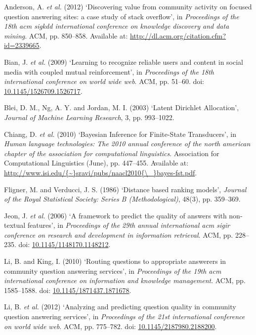 \documentclass[11pt,preprint, authoryear]{article}
\numberwithin{equation}{section}
\begin{document}
\hypertarget{ref-Anderson2012}{}
Anderson, A. \emph{et al.} (2012) `Discovering value from community
activity on focused question answering sites: a case study of stack
overflow', in \emph{Proceedings of the 18th acm sigkdd international
conference on knowledge discovery and data mining}. ACM, pp. 850--858.
Available at: \url{http://dl.acm.org/citation.cfm?id=2339665}.

\hypertarget{ref-Bian2009}{}
Bian, J. \emph{et al.} (2009) `Learning to recognize reliable users and
content in social media with coupled mutual reinforcement', in
\emph{Proceedings of the 18th international conference on world wide
web}. ACM, pp. 51--60. doi:
\href{https://doi.org/10.1145/1526709.1526717}{10.1145/1526709.1526717}.

\hypertarget{ref-Blei2003}{}
Blei, D. M., Ng, A. Y. and Jordan, M. I. (2003) `Latent Dirichlet
Allocation', \emph{Journal of Machine Learning Research}, 3, pp.
993--1022.

\hypertarget{ref-Chiang2010}{}
Chiang, D. \emph{et al.} (2010) `Bayesian Inference for Finite-State
Transducers', in \emph{Human language technologies: The 2010 annual
conference of the north american chapter of the association for
computational linguistics}. Association for Computational Linguistics
(June), pp. 447--455. Available at:
\href{http://www.isi.edu/\%7B~\%7Dsravi/pubs/naacl2010\%7B/_\%7Dbayes-fst.pdf}{http://www.isi.edu/\{\textasciitilde{}\}sravi/pubs/naacl2010\{\textbackslash{}\_\}bayes-fst.pdf}.

\hypertarget{ref-Fligner1986}{}
Fligner, M. and Verducci, J. S. (1986) `Distance based ranking models',
\emph{Journal of the Royal Statistical Society: Series B
(Methodological)}, 48(3), pp. 359--369.

\hypertarget{ref-Jeon2006}{}
Jeon, J. \emph{et al.} (2006) `A framework to predict the quality of
answers with non-textual features', in \emph{Proceedings of the 29th
annual international acm sigir conference on research and development in
information retrieval}. ACM, pp. 228--235. doi:
\href{https://doi.org/10.1145/1148170.1148212}{10.1145/1148170.1148212}.

\hypertarget{ref-Li2010}{}
Li, B. and King, I. (2010) `Routing questions to appropriate answerers
in community question answering services', in \emph{Proceedings of the
19th acm international conference on information and knowledge
management}. ACM, pp. 1585--1588. doi:
\href{https://doi.org/10.1145/1871437.1871678}{10.1145/1871437.1871678}.

\hypertarget{ref-Li2012}{}
Li, B. \emph{et al.} (2012) `Analyzing and predicting question quality
in community question answering services', in \emph{Proceedings of the
21st international conference on world wide web}. ACM, pp. 775--782.
doi:
\href{https://doi.org/10.1145/2187980.2188200}{10.1145/2187980.2188200}.
\end{document}
